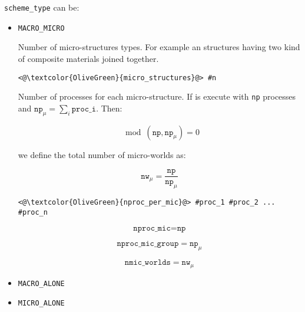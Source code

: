 \texttt{scheme\_type} can be:

\begin{itemize}
\item \texttt{MACRO_MICRO}

Number of micro-structures types. For example an structures having two kind of composite materials
joined together.

\begin{lstlisting}[frame=single]
     <@\textcolor{OliveGreen}{micro_structures}@> #n
\end{lstlisting}

Number of processes for each micro-structure. If \micro is execute with \texttt{np} processes and $\texttt{np}_{\mu} =
\sum_{i} \texttt{proc_{i}}$. Then:

$$\mod{(\texttt{np} ,\texttt{np}_{\mu})} = 0$$

we define the total number of micro-worlds as:

$$\texttt{nw}_{\mu} = \frac{\texttt{np}}{\texttt{np}_{\mu}}$$

\begin{lstlisting}[frame=single]
     <@\textcolor{OliveGreen}{nproc_per_mic}@> #proc_1 #proc_2 ... #proc_n
\end{lstlisting}

$$ \texttt{nproc_mic} = \texttt{np} $$

$$ \texttt{nproc_mic_group} = \texttt{np}_{\mu} $$

$$ \texttt{nmic_worlds} = \texttt{nw}_{\mu} $$

\item \texttt{MACRO_ALONE}   
\item \texttt{MICRO_ALONE}    
\end{itemize}




